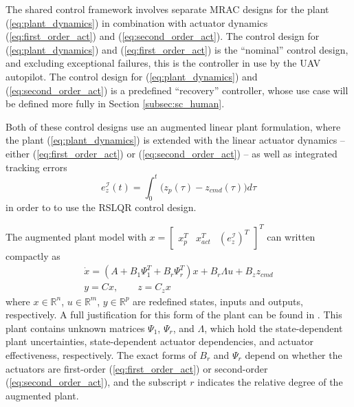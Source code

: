 \documentclass[english]{ifacconf}
\begin{document}
The shared control framework involves separate MRAC designs for the plant (\ref{eq:plant_dynamics}) in combination with actuator dynamics (\ref{eq:first_order_act}) and (\ref{eq:second_order_act}). The control design for (\ref{eq:plant_dynamics}) and (\ref{eq:first_order_act}) is the ``nominal'' control design, and excluding exceptional failures, this is the controller in use by the UAV autopilot. The control design for (\ref{eq:plant_dynamics}) and (\ref{eq:second_order_act}) is a predefined ``recovery'' controller, whose use case will be defined more fully in Section \ref{subsec:sc_human}.

Both of these control designs use an augmented linear plant formulation, where the plant (\ref{eq:plant_dynamics}) is extended with the linear actuator dynamics -- either (\ref{eq:first_order_act}) or (\ref{eq:second_order_act}) -- as well as integrated tracking errors 
\begin{equation}
	e_z^{\mathcal{I}}(t) = \int_0^{t} \big( z_p(\tau) - z_{cmd}(\tau)\big) d\tau
\end{equation}
in order to to use the RSLQR control design.

The augmented plant model with $x = \begin{bmatrix} x_p^T & x_{act}^T & (e_z^{\mathcal{I}})^T\end{bmatrix}^T$ can written compactly as
\begin{equation}
\begin{array}{c}
\dot{x}= \left(A+B_{1}\Psi_{1}^{T}+B_{r}\Psi_{r}^{T}\right) x+B_{r}\Lambda u+B_{z}z_{cmd}\\
y=Cx,\qquad z=C_{z}x
\end{array} \label{eq:augmented_plant}
\end{equation}
where $x\in\mathbb{R}^{n}$, $u\in\mathbb{R}^{m}$, $y\in\mathbb{R}^{p}$ are redefined states, inputs and outputs, respectively. A full justification for this form of the plant can be found in \cite{qu2016phd, qu2016adaptive}. This plant contains unknown matrices $\Psi_1$, $\Psi_r$, and $\Lambda$, which hold the state-dependent plant uncertainties, state-dependent actuator dependencies, and actuator effectiveness, respectively. The exact forms of $B_r$ and $\Psi_r$ depend on whether the actuators are first-order (\ref{eq:first_order_act}) or second-order (\ref{eq:second_order_act}), and the subscript $r$ indicates the relative degree of the augmented plant.
\end{document}
